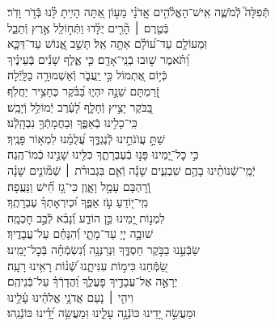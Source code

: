 \documentclass[twoside, openany, parskip=half, 11pt]{book}
\begin{document}
\begin{narrow}
תְּֿפִלָּה֮ לְֿמֹשֶׁ֢ה אִֽישׁ־הָאֱלֹ֫הִ֥ים \hfill \break
 אֲֽדֹנָ֗י \hfill מָע֣וֹן אַ֭תָּה הָיִ֥יתָ לָּ֗נוּ בְּֿדֹ֣ר וָדֹֽר׃ \\
 בְּֿטֶ֤רֶם ׀ הָ֘רִ֤ים יֻלָּ֗דוּ \hfill וַתְּֿח֣וֹלֵֽל אֶ֣רֶץ וְֿתֵבֵ֑ל \\ וּֽמֵעוֹלָ֥ם עַד־ע֝וֹלָ֗ם אַתָּ֥ה אֵֽל׃ \hfill
 תָּשֵׁ֣ב אֱ֭נוֹשׁ עַד־דַּכָּ֑א\\ וַ֝תֹּ֗אמֶר שׁ֣וּבוּ בְֿנֵֽי־אָדָֽם׃ \hfill
 כִּ֤י אֶ֪לֶף שָׁנִ֡ים בְּֽֿעֵינֶ֗יךָ \\ כְּֿי֣וֹם אֶ֭תְמוֹל כִּ֣י יַֽעֲבֹ֑ר \hfill וְֿאַשְׁמוּרָ֥ה בַלָּֽיְֿלָה׃ \\
 זְֿ֭רַמְתָּם שֵׁנָ֣ה יִהְי֑וּ \hfill בַּ֝בֹּ֗קֶר כֶּחָצִ֥יר יַחֲלֹֽף׃ \\
 בַּ֭בֹּקֶר יָצִ֣יץ וְֿחָלָ֑ף \hfill לָ֝עֶ֗רֶב יְֿמוֹלֵ֥ל וְֿיָבֵֽשׁ׃ \\
 כִּֽי־כָלִ֥ינוּ בְֿאַפֶּ֑ךָ \hfill וּֽבַחֲמָתְֿךָ֥ נִבְהָֽלְֿנוּ׃ \\
 שַׁתָּ֣ עֲוֺנֹתֵ֣ינוּ לְֿנֶגְדֶּ֑ךָ \hfill עֲ֝לֻמֵ֗נוּ לִמְא֥וֹר פָּנֶֽיךָ׃ \\
 כִּ֣י כׇל־יָ֭מֵינוּ פָּנ֣וּ בְֿעֶבְרָתֶ֑ךָ \hfill כִּלִּ֖ינוּ שָׁנֵ֣ינוּ כְֿמוֹ־הֶֽגֶה׃ \\
 יְֿמֵֽי־שְֿֿׁנוֹתֵ֨ינוּ בָהֶ֥ם שִׁבְעִ֪ים שָׁנָ֡ה \hfill וְֿאִ֤ם בִּגְבוּרֹ֨ת ׀ שְֿׁמ֘וֹנִ֤ים שָׁנָ֗ה\\ וְֿ֭רׇהְבָּם עָמָ֣ל וָאָ֑וֶן \hfill כִּי־גָ֥ז חִ֗֝ישׁ וַנָּעֻֽפָה׃ \\
מִֽי־י֭וֹדֵעַ עֹ֣ז אַפֶּ֑ךָ \hfill וּ֝כְיִרְאָתְךָ֗ עֶבְרָתֶֽךָ׃ \\
 לִמְנ֣וֹת יָ֭מֵינוּ כֵּ֣ן הוֹדַ֑ע \hfill וְֿ֝נָבִ֗א לְֿבַ֣ב חׇכְמָֽה׃ \\
 שׁוּבָ֣ה יְיָ֭ עַד־מָתָ֑י \hfill וְֿ֝הִנָּחֵ֗ם עַל־עֲבָדֶֽיךָ׃ \\
 שַׂבְּֿעֵ֣נוּ בַבֹּ֣קֶר חַסְדֶּ֑ךָ \hfill וּֽנְרַנְּנָ֥ה וְֿ֝נִשְׂמְֿחָ֗ה בְּֿכׇל־יָמֵֽינוּ׃ \\
 שַׂ֭מְּֿחֵנוּ כִּימ֣וֹת עִנִּיתָ֑נוּ \hfill שְֿׁ֝נ֗וֹת רָאִ֥ינוּ רָעָֽה׃ \\
 יֵרָאֶ֣ה אֶל־עֲבָדֶ֣יךָ פׇעֳלֶ֑ךָ \hfill וַ֝הֲדָרְֿךָ֗ עַל־בְּֿנֵיהֶֽם׃ \\
וִיהִ֤י ׀ נֹ֤עַם אֲדֹנָ֥י אֱלֹהֵ֗ינוּ \hfill עָ֫לֵ֥ינוּ \\ וּמַעֲשֵׂ֣ה יָ֭דֵינוּ כּוֹנְֿנָ֥ה עָלֵ֑ינוּ \hfill וּֽמַעֲשֵׂ֥ה יָ֝דֵ֗ינוּ כּוֹנְֿנֵֽהוּ׃ \\



\end{narrow}
\end{document}
